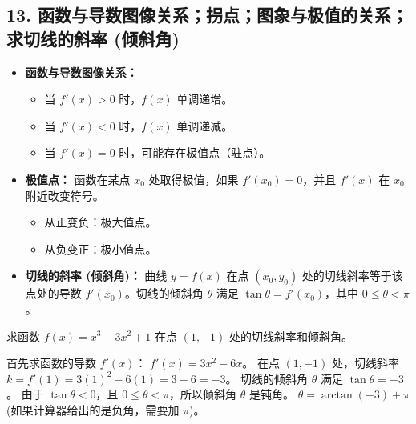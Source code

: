 \subsection*{13. 函数与导数图像关系；拐点；图象与极值的关系；求切线的斜率 (倾斜角)}

\begin{theorem}
    \begin{itemize}
        \item \textbf{函数与导数图像关系：}
              \begin{itemize}
                  \item 当 $f'(x) > 0$ 时，$f(x)$ 单调递增。
                  \item 当 $f'(x) < 0$ 时，$f(x)$ 单调递减。
                  \item 当 $f'(x) = 0$ 时，可能存在极值点（驻点）。
              \end{itemize}

        \item \textbf{极值点：} 函数在某点 $x_0$ 处取得极值，如果 $f'(x_0)=0$，并且 $f'(x)$ 在 $x_0$ 附近改变符号。
              \begin{itemize}
                  \item 从正变负：极大值点。
                  \item 从负变正：极小值点。
              \end{itemize}

        \item \textbf{切线的斜率 (倾斜角)：} 曲线 $y=f(x)$ 在点 $(x_0, y_0)$ 处的切线斜率等于该点处的导数 $f'(x_0)$。切线的倾斜角 $\theta$ 满足 $\tan \theta = f'(x_0)$，其中 $0 \le \theta < \pi$。
    \end{itemize}
\end{theorem}

\begin{example}
    求函数 $f(x) = x^3 - 3x^2 + 1$ 在点 $(1, -1)$ 处的切线斜率和倾斜角。
\end{example}
\begin{solution}
    首先求函数的导数 $f'(x)$：
    $f'(x) = 3x^2 - 6x$。
    在点 $(1, -1)$ 处，切线斜率 $k = f'(1) = 3(1)^2 - 6(1) = 3 - 6 = -3$。
    切线的倾斜角 $\theta$ 满足 $\tan \theta = -3$。
    由于 $\tan \theta < 0$，且 $0 \le \theta < \pi$，所以倾斜角 $\theta$ 是钝角。
    $\theta = \arctan(-3) + \pi$ (如果计算器给出的是负角，需要加 $\pi$)。
\end{solution}

